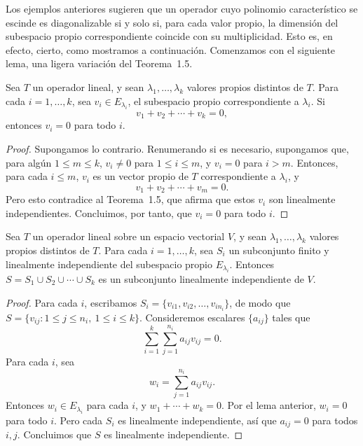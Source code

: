 \documentclass[12pt,a4paper]{book}
\begin{document}
    Los ejemplos anteriores sugieren que un operador cuyo polinomio característico se escinde es diagonalizable si y solo si, para cada valor propio, la dimensión del subespacio propio correspondiente coincide con su multiplicidad. Esto es, en efecto, cierto, como mostramos a continuación. Comenzamos con el siguiente lema, una ligera variación del Teorema~1.5.

    \begin{lema}
        Sea $T$ un operador lineal, y sean $\lambda_1,\dots,\lambda_k$ valores propios distintos de $T$. Para cada $i=1,\dots,k$, sea $v_i\in E_{\lambda_i}$, el subespacio propio correspondiente a $\lambda_i$. Si
        \begin{equation*}
            v_1+v_2+\cdots+v_k=0,
        \end{equation*}
        entonces $v_i=0$ para todo $i$.
    \end{lema}

    \begin{proof}
        Supongamos lo contrario. Renumerando si es necesario, supongamos que, para algún $1\leq m\leq k$, $v_i\neq 0$ para $1\leq i\leq m$, y $v_i=0$ para $i>m$. Entonces, para cada $i\leq m$, $v_i$ es un vector propio de $T$ correspondiente a $\lambda_i$, y
        \begin{equation*}
            v_1+v_2+\cdots+v_m=0.
        \end{equation*}
        Pero esto contradice al Teorema~1.5, que afirma que estos $v_i$ son linealmente independientes. Concluimos, por tanto, que $v_i=0$ para todo $i$.
    \end{proof}

    \begin{teorema}
        Sea $T$ un operador lineal sobre un espacio vectorial $V$, y sean $\lambda_1,\dots,\lambda_k$ valores propios distintos de $T$. Para cada $i=1,\dots,k$, sea $S_i$ un subconjunto finito y linealmente independiente del subespacio propio $E_{\lambda_i}$. Entonces $S=S_1\cup S_2\cup\cdots\cup S_k$ es un subconjunto linealmente independiente de $V$.
    \end{teorema}

    \begin{proof}
        Para cada $i$, escribamos $S_i=\{v_{i1},v_{i2},\dots,v_{in_i}\}$, de modo que $S=\{v_{ij}: 1\leq j\leq n_i,\ 1\leq i\leq k\}$. Consideremos escalares $\{a_{ij}\}$ tales que
        \begin{equation*}
            \sum_{i=1}^{k}\sum_{j=1}^{n_i}a_{ij}v_{ij}=0.
        \end{equation*}
        Para cada $i$, sea
        \begin{equation*}
            w_i=\sum_{j=1}^{n_i}a_{ij}v_{ij}.
        \end{equation*}
        Entonces $w_i\in E_{\lambda_i}$ para cada $i$, y $w_1+\cdots+w_k=0$. Por el lema anterior, $w_i=0$ para todo $i$. Pero cada $S_i$ es linealmente independiente, así que $a_{ij}=0$ para todos $i,j$. Concluimos que $S$ es linealmente independiente.
    \end{proof}
\end{document}
